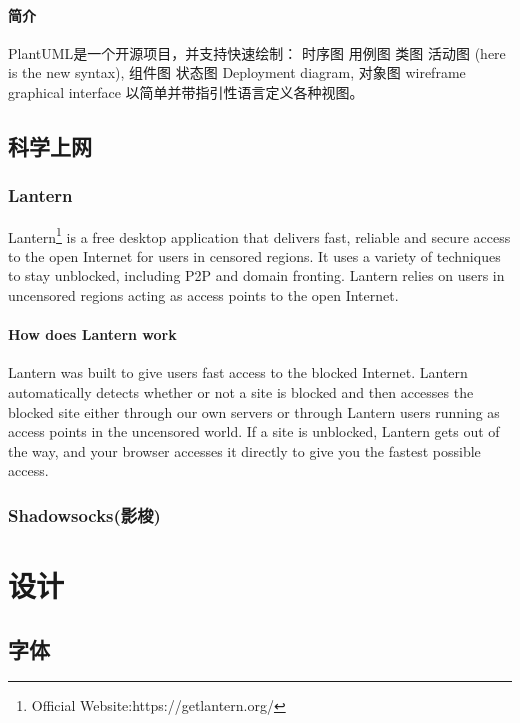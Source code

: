 \documentclass{book}
\begin{document}
\subsection{简介}

PlantUML是一个开源项目，并支持快速绘制：
时序图
用例图
类图
活动图 (here is the new syntax),
组件图
状态图
Deployment diagram,
对象图
wireframe graphical interface
以简单并带指引性语言定义各种视图。

\chapter{科学上网}

\section{Lantern}

Lantern\footnote{Official Website:https://getlantern.org/} is a free desktop application that delivers fast, 
reliable and secure access to the open Internet for users in censored regions. 
It uses a variety of techniques to stay unblocked, including P2P and domain fronting. 
Lantern relies on users in uncensored regions acting as access points to the open Internet. 

\subsection{How does Lantern work}

Lantern was built to give users fast access to the blocked Internet. 
Lantern automatically detects whether or not a site is blocked 
and then accesses the blocked site either through our own servers 
or through Lantern users running as access points in the uncensored world. 
If a site is unblocked, Lantern gets out of the way, 
and your browser accesses it directly to give you the fastest possible access.

\section{Shadowsocks(影梭)}

\clearpage

\part{设计}

\chapter{字体}
\end{document}

